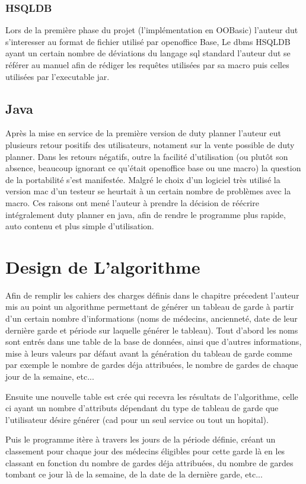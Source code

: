 \documentclass[11pt]{report}
\begin{document}
\subsubsection{HSQLDB}
Lors de la première phase du projet (l'implémentation en OOBasic) l'auteur dut s'interesser au format de fichier utilisé par openoffice Base, Le dbms HSQLDB ayant un certain nombre de déviations du langage sql standard l'auteur dut se référer au manuel\cite{manhsqldb} afin de rédiger les requêtes utilisées par sa macro puis celles utilisées par l'executable jar.

\subsection{Java}
Après la mise en service de la première version de duty planner l'auteur eut plusieurs retour positifs des utilisateurs, notament sur la vente possible de duty planner. 
Dans les retours négatifs, outre la facilité d'utilisation (ou plutôt son absence, beaucoup ignorant ce qu'était openoffice base ou une macro) la question de la portabilité s'est manifestée. 
Malgré le choix d'un logiciel très utilisé la version mac d'un testeur se heurtait à un certain nombre de problèmes avec la macro.
Ces raisons ont mené l'auteur à prendre la décision de réécrire intégralement duty planner en java, afin de rendre le programme plus rapide, auto contenu et plus simple d'utilisation.
\section{Design de L'algorithme}
Afin de remplir les cahiers des charges définis dans le chapitre précedent l'auteur mis au point un algorithme permettant de générer un tableau de garde à partir d'un certain nombre d'informations (noms de médecins, ancienneté, date de leur dernière garde et période sur laquelle générer le tableau).
Tout d'abord les noms sont entrés dans une table de la base de données, ainsi que d'autres informations, mise à leurs valeurs par défaut avant la génération du  tableau de garde comme par exemple le nombre de gardes déja attribuées, le nombre de gardes de chaque jour de la semaine, etc...


Ensuite une nouvelle table est crée qui recevra les résultats de l'algorithme, celle ci ayant un nombre d'attributs dépendant du type de tableau de garde que l'utilisateur désire générer (cad pour un seul service ou tout un hopital).

Puis le programme itère à travers les jours de la période définie, créant un classement pour chaque jour des médecins éligibles pour cette garde là en les classant en fonction du nombre de gardes déja attribuées, du nombre de gardes tombant ce jour là de la semaine, de la date de la dernière garde, etc...
\end{document}
